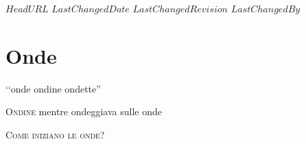 \svnidlong
{$HeadURL$}
{$LastChangedDate$}
{$LastChangedRevision$}
{$LastChangedBy$}

\chapter{Onde}
\begin{introduction}
	‘‘onde ondine ondette''
	\begin{flushright}
		\textsc{Ondine} mentre ondeggiava sulle onde%
	\end{flushright}
\end{introduction}
\lettrine[findent=1pt, nindent=0pt]{C}{ome iniziano le onde?} 
%
%	
%	
%		
%
